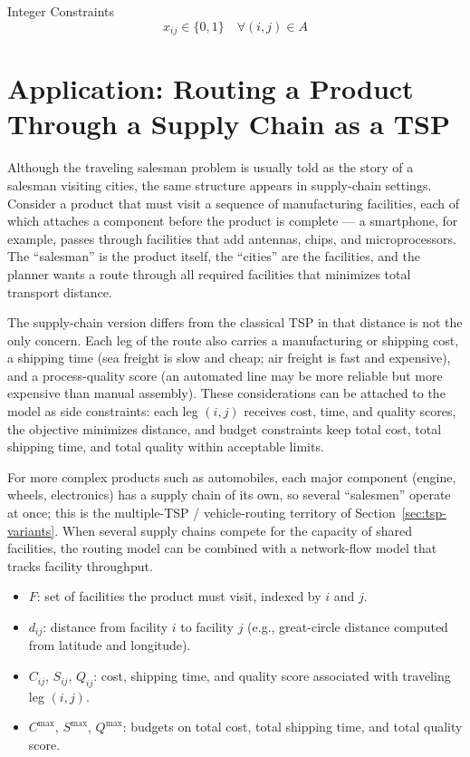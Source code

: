 Integer Constraints
\begin{equation}
x_{ij} \in \{0,1\} \quad \forall (i,j) \in A
\end{equation}

\section{Application: Routing a Product Through a Supply Chain as a TSP}

Although the traveling salesman problem is usually told as the story of a salesman visiting cities, the same structure appears in supply-chain settings. Consider a product that must visit a sequence of manufacturing facilities, each of which attaches a component before the product is complete --- a smartphone, for example, passes through facilities that add antennas, chips, and microprocessors. The ``salesman'' is the product itself, the ``cities'' are the facilities, and the planner wants a route through all required facilities that minimizes total transport distance.

The supply-chain version differs from the classical TSP in that distance is not the only concern. Each leg of the route also carries a manufacturing or shipping cost, a shipping time (sea freight is slow and cheap; air freight is fast and expensive), and a process-quality score (an automated line may be more reliable but more expensive than manual assembly). These considerations can be attached to the model as side constraints: each leg $(i,j)$ receives cost, time, and quality scores, the objective minimizes distance, and budget constraints keep total cost, total shipping time, and total quality within acceptable limits.

For more complex products such as automobiles, each major component (engine, wheels, electronics) has a supply chain of its own, so several ``salesmen'' operate at once; this is the multiple-TSP / vehicle-routing territory of Section~\ref{sec:tsp-variants}. When several supply chains compete for the capacity of shared facilities, the routing model can be combined with a network-flow model that tracks facility throughput.

\begin{itemize}
    \item $F$: set of facilities the product must visit, indexed by $i$ and $j$.
\end{itemize}

\begin{itemize}
    \item $d_{ij}$: distance from facility $i$ to facility $j$ (e.g., great-circle distance computed from latitude and longitude).
    \item $C_{ij}$, $S_{ij}$, $Q_{ij}$: cost, shipping time, and quality score associated with traveling leg $(i,j)$.
    \item $C^{\max}$, $S^{\max}$, $Q^{\max}$: budgets on total cost, total shipping time, and total quality score.
\end{itemize}

